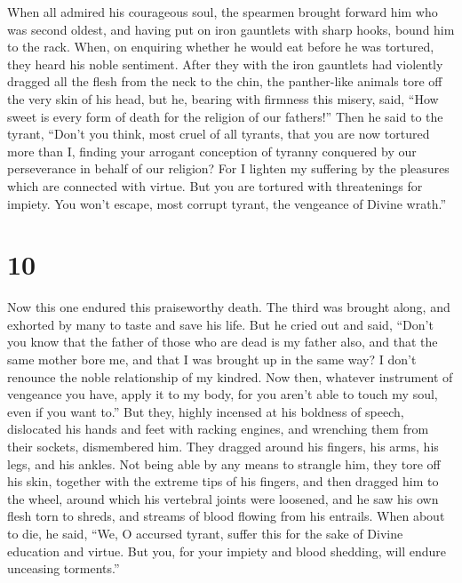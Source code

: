  When all admired his courageous soul, the spearmen
brought forward him who was second oldest, and having put on iron
gauntlets with sharp hooks, bound him to the rack.  When,
on enquiring whether he would eat before he was tortured, they heard his
noble sentiment.  After they with the iron gauntlets had
violently dragged all the flesh from the neck to the chin, the
panther-like animals tore off the very skin of his head, but he, bearing
with firmness this misery, said,  ``How sweet is every
form of death for the religion of our fathers!'' Then he said to the
tyrant,  ``Don't you think, most cruel of all tyrants,
that you are now tortured more than I, finding your arrogant conception
of tyranny conquered by our perseverance in behalf of our religion?
 For I lighten my suffering by the pleasures which are
connected with virtue.  But you are tortured with
threatenings for impiety. You won't escape, most corrupt tyrant, the
vengeance of Divine wrath.''

\hypertarget{section-9}{%
\section{10}\label{section-9}}

 Now this one endured this praiseworthy death. The third
was brought along, and exhorted by many to taste and save his life.
 But he cried out and said, ``Don't you know that the
father of those who are dead is my father also, and that the same mother
bore me, and that I was brought up in the same way?  I
don't renounce the noble relationship of my kindred.  Now
then, whatever instrument of vengeance you have, apply it to my body,
for you aren't able to touch my soul, even if you want to.''
 But they, highly incensed at his boldness of speech,
dislocated his hands and feet with racking engines, and wrenching them
from their sockets, dismembered him.  They dragged around
his fingers, his arms, his legs, and his ankles.  Not
being able by any means to strangle him, they tore off his skin,
together with the extreme tips of his fingers, and then dragged him to
the wheel,  around which his vertebral joints were
loosened, and he saw his own flesh torn to shreds, and streams of blood
flowing from his entrails.  When about to die, he said,
 ``We, O accursed tyrant, suffer this for the sake of
Divine education and virtue.  But you, for your impiety
and blood shedding, will endure unceasing torments.''

